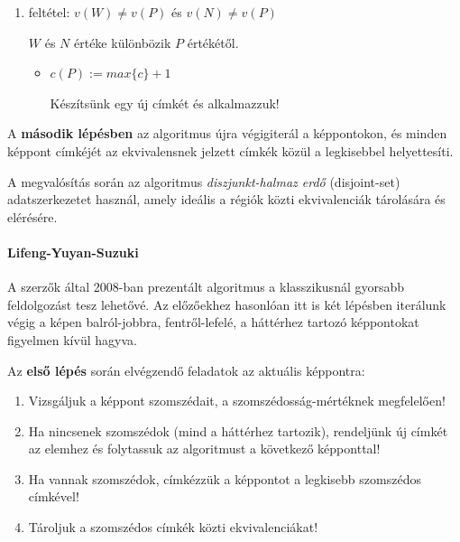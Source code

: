 \begin{enumerate}
  \item feltétel: $v(W) \neq v(P)$ és $v(N) \neq v(P)$  \\ \begin{small}$W$ és $N$ értéke különbözik $P$ értékétől.\end{small}
    \begin{itemize}
      \item $c(P) := max \lbrace c \rbrace + 1$ \\ \begin{small}Készítsünk egy új címkét és alkalmazzuk!\end{small}
    \end{itemize}

\end{enumerate}

A \textbf{második lépésben} az algoritmus újra végigiterál a képpontokon, és minden képpont címkéjét az ekvivalensnek jelzett címkék közül a legkisebbel helyettesíti.

A megvalósítás során az algoritmus \emph{diszjunkt-halmaz erdő} (disjoint-set) adatszerkezetet használ, amely ideális a régiók közti ekvivalenciák tárolására és elérésére. 


\paragraph{Lifeng-Yuyan-Suzuki}

A szerzők által 2008-ban prezentált algoritmus \cite{suzuki} a klasszikusnál gyorsabb feldolgozást tesz lehetővé. Az előzőekhez hasonlóan itt is két lépésben iterálunk végig a képen balról-jobbra, fentről-lefelé, a háttérhez tartozó képpontokat figyelmen kívül hagyva.

\bigskip

Az \textbf{első lépés} során elvégzendő feladatok az aktuális képpontra:

\begin{enumerate}
  \item Vizsgáljuk a képpont szomszédait, a szomszédosság-mértéknek megfelelően!
  \item Ha nincsenek szomszédok (mind a háttérhez tartozik), rendeljünk új címkét az elemhez és folytassuk az algoritmust a következő képponttal!
  \item Ha vannak szomszédok, címkézzük a képpontot a legkisebb szomszédos címkével!
  \item Tároljuk a szomszédos címkék közti ekvivalenciákat!
\end{enumerate}

